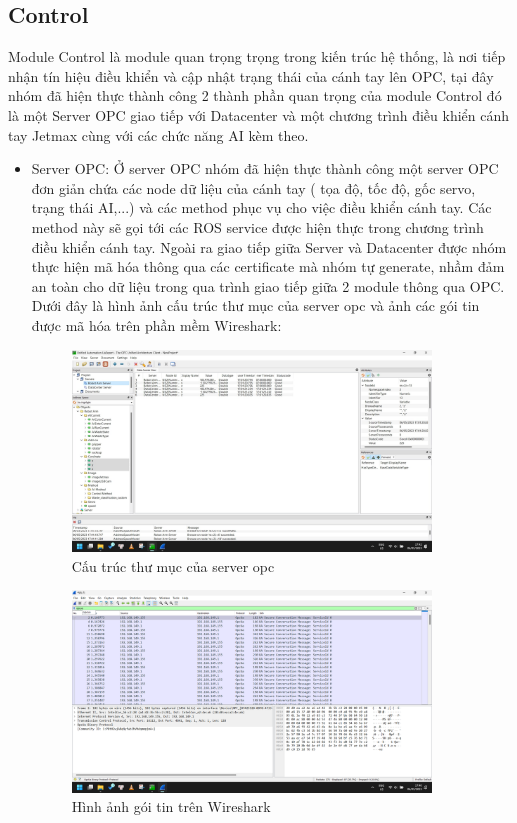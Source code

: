 \subsection{Control}
Module Control là module quan trọng trọng trong kiến trúc hệ thống, là nơi tiếp nhận tín hiệu điều khiển và cập nhật trạng thái của cánh tay lên OPC, tại đây nhóm đã hiện thực thành công 2 thành phần quan trọng của module Control đó là một Server OPC giao tiếp với Datacenter và một chương trình điều khiển cánh tay Jetmax cùng với các chức năng AI kèm theo.
\begin{itemize}
    \item Server OPC: Ở server OPC nhóm đã hiện thực thành công một server OPC đơn giản chứa các node dữ liệu của cánh tay ( tọa độ, tốc độ, gốc servo, trạng thái AI,...) và các method phục vụ cho việc điều khiển cánh tay. Các method này sẽ gọi tới các ROS service được hiện thực trong chương trình điều khiển cánh tay. Ngoài ra giao tiếp giữa Server và Datacenter được nhóm thực hiện mã hóa thông qua các certificate mà nhóm tự generate, nhầm đảm an toàn cho dữ liệu trong qua trình giao tiếp giữa 2 module thông qua OPC. Dưới đây là hình ảnh cấu trúc thư mục của server opc và ảnh các gói tin được mã hóa trên phần mềm Wireshark:
    \begin{figure}[H]
    \centering
    \includegraphics[width=0.9\textwidth]{Images/Result/datastructure_server.jpg}
    \caption{Cấu trúc thư mục của server opc}
    \end{figure}
    
    \begin{figure}[H]
    \centering
    \includegraphics[width=0.9\textwidth]{Images/Result/wireshark.png}
    \caption{Hình ảnh gói tin trên Wireshark}
    \end{figure} 
    

\end{itemize}
